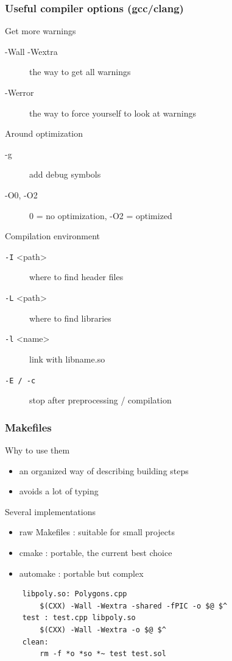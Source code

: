 \begin{frame}[fragile]
  \frametitle{Useful compiler options (gcc/clang)}
  \begin{block}{Get more warnings}
    \begin{description}
      \item[-Wall -Wextra] the way to get all warnings
      \item[-Werror] the way to force yourself to look at warnings
    \end{description}
  \end{block}
  \begin{block}{Around optimization}
    \begin{description}
      \item[-g] add debug symbols
      \item[-O0, -O2] 0 = no optimization, -O2 = optimized
    \end{description}
  \end{block}
  \begin{block}{Compilation environment}
    \begin{description}
      \item[\texttt{-I} \textless{}path\textgreater] where to find header files
      \item[\texttt{-L} \textless{}path\textgreater] where to find libraries
      \item[\texttt{-l} \textless{}name\textgreater] link with libname.so
      \item[\texttt{-E / -c}] stop after preprocessing / compilation
    \end{description}
  \end{block}
\end{frame}

\begin{frame}[fragile]
  \frametitle{Makefiles}
  \begin{block}{Why to use them}
    \begin{itemize}
    \item an organized way of describing building steps
    \item avoids a lot of typing
    \end{itemize}
  \end{block}
  \begin{block}{Several implementations}
    \begin{itemize}
    \item raw Makefiles : suitable for small projects
    \item cmake : portable, the current best choice
    \item automake : portable but complex
      \end{itemize}
  \end{block}
  \begin{verbatim}
    libpoly.so: Polygons.cpp
        $(CXX) -Wall -Wextra -shared -fPIC -o $@ $^
    test : test.cpp libpoly.so
        $(CXX) -Wall -Wextra -o $@ $^
    clean:
        rm -f *o *so *~ test test.sol
  \end{verbatim}
\end{frame}

